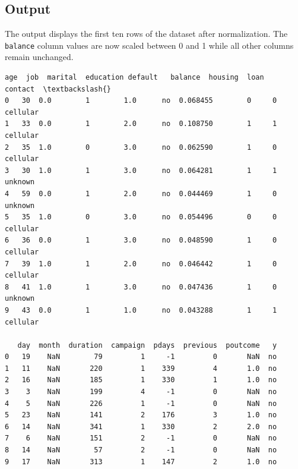 \documentclass[11pt]{article}
\makeatletter
\newcommand{\boxspacing}{\kern\kvtcb@left@rule\kern\kvtcb@boxsep}
\newcommand{\prompt}[4]{
        {\ttfamily\llap{{\color{#2}[#3]:\hspace{3pt}#4}}\vspace{-\baselineskip}}
    }
\makeatother
\begin{document}
\subsection*{Output}
The output displays the first ten rows of the dataset after normalization. The \texttt{balance} column values are now scaled between 0 and 1 while all other columns remain unchanged.
            \begin{tcolorbox}[breakable, size=fbox, boxrule=.5pt, pad at break*=1mm, opacityfill=0]
\prompt{Out}{outcolor}{16}{\boxspacing}
\begin{Verbatim}[commandchars=\\\{\}]
   age  job  marital  education default   balance  housing  loan   contact  \textbackslash{}
0   30  0.0        1        1.0      no  0.068455        0     0  cellular
1   33  0.0        1        2.0      no  0.108750        1     1  cellular
2   35  1.0        0        3.0      no  0.062590        1     0  cellular
3   30  1.0        1        3.0      no  0.064281        1     1   unknown
4   59  0.0        1        2.0      no  0.044469        1     0   unknown
5   35  1.0        0        3.0      no  0.054496        0     0  cellular
6   36  0.0        1        3.0      no  0.048590        1     0  cellular
7   39  1.0        1        2.0      no  0.046442        1     0  cellular
8   41  1.0        1        3.0      no  0.047436        1     0   unknown
9   43  0.0        1        1.0      no  0.043288        1     1  cellular

   day  month  duration  campaign  pdays  previous  poutcome   y
0   19    NaN        79         1     -1         0       NaN  no
1   11    NaN       220         1    339         4       1.0  no
2   16    NaN       185         1    330         1       1.0  no
3    3    NaN       199         4     -1         0       NaN  no
4    5    NaN       226         1     -1         0       NaN  no
5   23    NaN       141         2    176         3       1.0  no
6   14    NaN       341         1    330         2       2.0  no
7    6    NaN       151         2     -1         0       NaN  no
8   14    NaN        57         2     -1         0       NaN  no
9   17    NaN       313         1    147         2       1.0  no
\end{Verbatim}
\end{tcolorbox}
        
        
        
\end{document}
